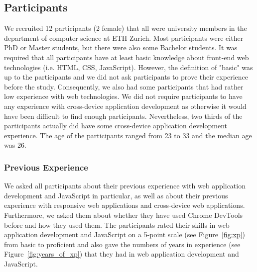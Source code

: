 \subsection{Participants}

We recruited 12 participants (2 female) that all were university members in the department of computer science at ETH Zurich. Most participants were either PhD or Master students, but there were also some Bachelor students. It was required that all participants have at least basic knowledge about front-end web technologies (i.e. HTML, CSS, JavaScript). However, the definition of "basic" was up to the participants and we did not ask participants to prove their experience before the study. Consequently, we also had some participants that had rather low experience with web technologies. We did not require participants to have any experience with cross-device application development as otherwise it would have been difficult to find enough participants. Nevertheless, two thirds of the participants actually did have some cross-device application development experience. The age of the participants ranged from 23 to 33 and the median age was 26. 

\subsubsection{Previous Experience}
We asked all participants about their previous experience with web application development and JavaScript in particular, as well as about their previous experience with responsive web applications and cross-device web applications. Furthermore, we asked them about whether they have used Chrome DevTools before and how they used them. The participants rated their skills in web application development and JavaScript on a 5-point scale (see Figure~\ref{fig:xp}) from basic to proficient and also gave the numbers of years in experience (see Figure~\ref{fig:years_of_xp}) that they had in web application development and JavaScript.


